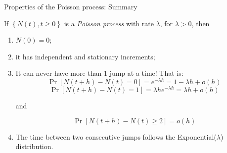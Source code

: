 \documentclass[11pt]{beamer}
\begin{document}
\begin{frame}

\end{frame}
\begin{frame}{Properties of the Poisson process: Summary}

If $\left\{ N\left( t\right) ,t\geq 0\right\} $ is a \textit{%
Poisson process} with rate $\lambda $, for $\lambda >0$, then
\begin{enumerate}
\item $N\left( 0\right) =0$;

\item it has independent \alert{and} stationary increments;

\item It can never have  more than 1 jump at a time! That is:
\begin{equation*}
\Pr \left[ N\left( t+h\right) -N\left( t\right) =0\right] =e^{-\lambda h}=1-\lambda h+o\left(
h\right)
\end{equation*}%
\begin{equation*}
\Pr \left[ N\left( t+h\right) -N\left( t\right) =1\right] =\lambda he^{-\lambda h}=\lambda h+o\left(
h\right)
\end{equation*}%

and 

\begin{equation*}
\Pr \left[ N\left( t+h\right) -N\left( t\right) \geq 2\right] =o\left(
h\right)
\end{equation*}


\item The time between two consecutive jumps follows the Exponential($\lambda$) distribution.
\end{enumerate}

\end{frame}
\end{document}
